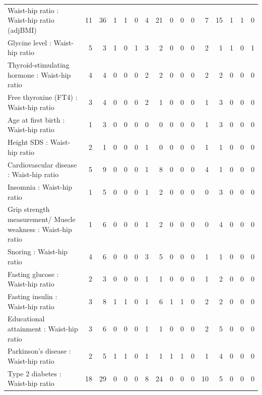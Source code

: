 \begin{table}[ht]
\begin{tabular}{lrrrrrrrrrrrrrrr}
  Waist-hip ratio  : Waist-hip ratio (adjBMI) &  11 &  36 &   1 &   1 &   0 &   4 &  21 &   0 &   0 &   0 &   7 &  15 &   1 &   1 &   0 \\ 
  Glycine level  : Waist-hip ratio  &   5 &   3 &   1 &   0 &   1 &   3 &   2 &   0 &   0 &   0 &   2 &   1 &   1 &   0 &   1 \\ 
  Thyroid-stimulating hormone  : Waist-hip ratio  &   4 &   4 &   0 &   0 &   0 &   2 &   2 &   0 &   0 &   0 &   2 &   2 &   0 &   0 &   0 \\ 
  Free thyroxine (FT4) : Waist-hip ratio  &   3 &   4 &   0 &   0 &   0 &   2 &   1 &   0 &   0 &   0 &   1 &   3 &   0 &   0 &   0 \\ 
  Age at first birth  : Waist-hip ratio  &   1 &   3 &   0 &   0 &   0 &   0 &   0 &   0 &   0 &   0 &   1 &   3 &   0 &   0 &   0 \\ 
  Height SDS : Waist-hip ratio  &   2 &   1 &   0 &   0 &   0 &   1 &   0 &   0 &   0 &   0 &   1 &   1 &   0 &   0 &   0 \\ 
  Cardiovascular disease : Waist-hip ratio  &   5 &   9 &   0 &   0 &   0 &   1 &   8 &   0 &   0 &   0 &   4 &   1 &   0 &   0 &   0 \\ 
  Insomnia : Waist-hip ratio  &   1 &   5 &   0 &   0 &   0 &   1 &   2 &   0 &   0 &   0 &   0 &   3 &   0 &   0 &   0 \\ 
  Grip strength measurement/ Muscle weakness : Waist-hip ratio  &   1 &   6 &   0 &   0 &   0 &   1 &   2 &   0 &   0 &   0 &   0 &   4 &   0 &   0 &   0 \\ 
  Snoring : Waist-hip ratio  &   4 &   6 &   0 &   0 &   0 &   3 &   5 &   0 &   0 &   0 &   1 &   1 &   0 &   0 &   0 \\ 
  Fasting glucose : Waist-hip ratio  &   2 &   3 &   0 &   0 &   0 &   1 &   1 &   0 &   0 &   0 &   1 &   2 &   0 &   0 &   0 \\ 
  Fasting insulin : Waist-hip ratio  &   3 &   8 &   1 &   1 &   0 &   1 &   6 &   1 &   1 &   0 &   2 &   2 &   0 &   0 &   0 \\ 
  Educational attainment : Waist-hip ratio  &   3 &   6 &   0 &   0 &   0 &   1 &   1 &   0 &   0 &   0 &   2 &   5 &   0 &   0 &   0 \\ 
  Parkinson's disease : Waist-hip ratio  &   2 &   5 &   1 &   1 &   0 &   1 &   1 &   1 &   1 &   0 &   1 &   4 &   0 &   0 &   0 \\ 
  Type 2 diabetes : Waist-hip ratio  &  18 &  29 &   0 &   0 &   0 &   8 &  24 &   0 &   0 &   0 &  10 &   5 &   0 &   0 &   0 \\ 

\end{tabular}
\end{table}
